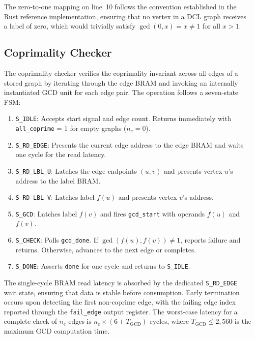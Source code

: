 \documentclass[lettersize,journal]{IEEEtran}
\begin{document}
The zero-to-one mapping on line~10 follows the convention established in the Rust reference implementation, ensuring that no vertex in a DCL graph receives a label of zero, which would trivially satisfy $\gcd(0, x) = x \neq 1$ for all $x > 1$.

\subsection{Coprimality Checker}

The coprimality checker verifies the coprimality invariant across all edges of a stored graph by iterating through the edge BRAM and invoking an internally instantiated GCD unit for each edge pair. The operation follows a seven-state FSM:

\begin{enumerate}
\item \texttt{S\_IDLE}: Accepts start signal and edge count. Returns immediately with \texttt{all\_coprime} = 1 for empty graphs ($n_e = 0$).
\item \texttt{S\_RD\_EDGE}: Presents the current edge address to the edge BRAM and waits one cycle for the read latency.
\item \texttt{S\_RD\_LBL\_U}: Latches the edge endpoints $(u, v)$ and presents vertex $u$'s address to the label BRAM.
\item \texttt{S\_RD\_LBL\_V}: Latches label $f(u)$ and presents vertex $v$'s address.
\item \texttt{S\_GCD}: Latches label $f(v)$ and fires \texttt{gcd\_start} with operands $f(u)$ and $f(v)$.
\item \texttt{S\_CHECK}: Polls \texttt{gcd\_done}. If $\gcd(f(u), f(v)) \neq 1$, reports failure and returns. Otherwise, advances to the next edge or completes.
\item \texttt{S\_DONE}: Asserts \texttt{done} for one cycle and returns to \texttt{S\_IDLE}.
\end{enumerate}

The single-cycle BRAM read latency is absorbed by the dedicated \texttt{S\_RD\_EDGE} wait state, ensuring that data is stable before consumption. Early termination occurs upon detecting the first non-coprime edge, with the failing edge index reported through the \texttt{fail\_edge} output register. The worst-case latency for a complete check of $n_e$ edges is $n_e \times (6 + T_{\text{GCD}})$ cycles, where $T_{\text{GCD}} \leq 2{,}560$ is the maximum GCD computation time.
\end{document}
